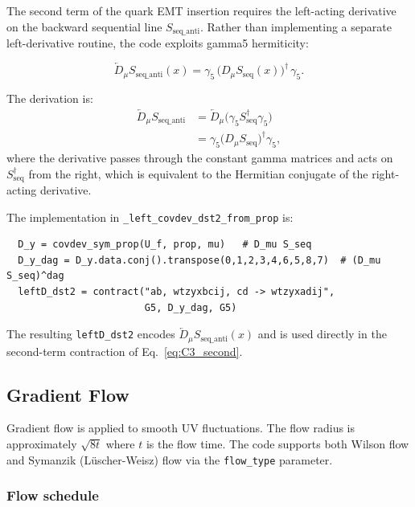 \documentclass[11pt,a4paper]{article}
\newcommand{\code}[1]{\texttt{#1}}
\begin{document}
The second term of the quark EMT insertion requires the left-acting derivative on the backward sequential line $S_{\text{seq\_anti}}$. Rather than implementing a separate left-derivative routine, the code exploits gamma5 hermiticity:

\begin{equation}\label{eq:leftD_via_gamma5}
  \overleftarrow{D}_\mu S_{\text{seq\_anti}}(x)
    = \gamma_5\,
      \big(D_\mu S_{\text{seq}}(x)\big)^\dagger\,
      \gamma_5.
\end{equation}

The derivation is:
\begin{align}
  \overleftarrow{D}_\mu S_{\text{seq\_anti}}
    &= \overleftarrow{D}_\mu \big( \gamma_5 S_{\text{seq}}^\dagger \gamma_5 \big) \\
    &= \gamma_5 \big( D_\mu S_{\text{seq}} \big)^\dagger \gamma_5,
\end{align}
where the derivative passes through the constant gamma matrices and acts on $S_{\text{seq}}^\dagger$ from the right, which is equivalent to the Hermitian conjugate of the right-acting derivative.

The implementation in \code{\_left\_covdev\_dst2\_from\_prop} is:

\begin{verbatim}
  D_y = covdev_sym_prop(U_f, prop, mu)   # D_mu S_seq
  D_y_dag = D_y.data.conj().transpose(0,1,2,3,4,6,5,8,7)  # (D_mu S_seq)^dag
  leftD_dst2 = contract("ab, wtzyxbcij, cd -> wtzyxadij",
                        G5, D_y_dag, G5)
\end{verbatim}

The resulting \code{leftD\_dst2} encodes $\overleftarrow{D}_\mu S_{\text{seq\_anti}}(x)$ and is used directly in the second-term contraction of Eq.~\eqref{eq:C3_second}.

\subsection{Gradient Flow}
\label{sec:flow_connected}

Gradient flow is applied to smooth UV fluctuations. The flow radius is approximately $\sqrt{8t}$ where $t$ is the flow time. The code supports both Wilson flow and Symanzik (L\"uscher-Weisz) flow via the \code{flow\_type} parameter.

\subsubsection{Flow schedule}
\end{document}
